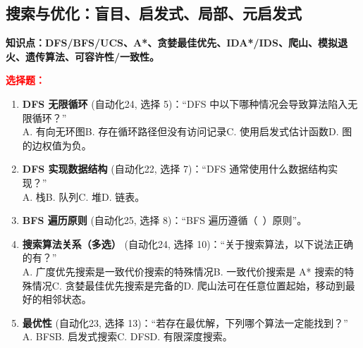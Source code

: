 ﻿\documentclass[../main.tex]{subfiles}
\begin{document}
\subsection{搜索与优化：盲目、启发式、局部、元启发式}

\noindent\textbf{知识点：DFS/BFS/UCS、A*、贪婪最佳优先、IDA*/IDS、爬山、模拟退火、遗传算法、可容许性/一致性。}

\noindent\textbf{\textcolor{red}{选择题：}}
\begin{enumerate}[itemsep=0.45em, topsep=0.2em, leftmargin=1.5em]
    \item \textbf{DFS 无限循环} \textcolor{autoclassgreen}{(自动化24, 选择 5)}：``DFS 中以下哪种情况会导致算法陷入无限循环？''\\
    A. 有向无环图\quad B. 存在循环路径但没有访问记录\quad C. 使用启发式估计函数\quad D. 图的边权值为负。 

    \item \textbf{DFS 实现数据结构} \textcolor{autoclassgreen}{(自动化22, 选择 7)}：``DFS 通常使用什么数据结构实现？''\\
    A. 栈\quad B. 队列\quad C. 堆\quad D. 链表。 

    \item \textbf{BFS 遍历原则} \textcolor{autoclassgreen}{(自动化25, 选择 8)}：``BFS 遍历遵循（\ ）原则''。\\
     

    \item \textbf{搜索算法关系（多选）} \textcolor{autoclassgreen}{(自动化24, 选择 10)}：``关于搜索算法，以下说法正确的有？''\\
    A. 广度优先搜索是一致代价搜索的特殊情况\quad B. 一致代价搜索是 A* 搜索的特殊情况\quad C. 贪婪最佳优先搜索是完备的\quad D. 爬山法可在任意位置起始，移动到最好的相邻状态。 

    \item \textbf{最优性} \textcolor{autoclassgreen}{(自动化23, 选择 13)}：``若存在最优解，下列哪个算法一定能找到？''\\
    A. BFS\quad B. 启发式搜索\quad C. DFS\quad D. 有限深度搜索。 


\end{enumerate}
\end{document}
